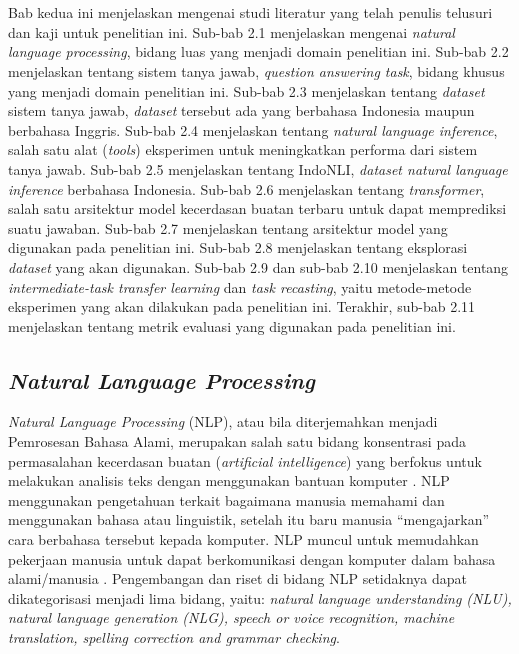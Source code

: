 \chapter{\babDua}
\label{bab:2}
Bab kedua ini menjelaskan mengenai studi literatur yang telah penulis telusuri dan kaji untuk penelitian ini. Sub-bab 2.1 menjelaskan mengenai \emph{natural language processing}, bidang luas yang menjadi domain penelitian ini. Sub-bab 2.2 menjelaskan tentang sistem tanya jawab, \emph{question answering task}, bidang khusus yang menjadi domain penelitian ini. Sub-bab 2.3 menjelaskan tentang \emph{dataset} sistem tanya jawab, \emph{dataset} tersebut ada yang berbahasa Indonesia maupun berbahasa Inggris. Sub-bab 2.4 menjelaskan tentang \emph{natural language inference}, salah satu alat (\emph{tools}) eksperimen untuk meningkatkan performa dari sistem tanya jawab. Sub-bab 2.5 menjelaskan tentang IndoNLI, \emph{dataset natural language inference} berbahasa Indonesia. Sub-bab 2.6 menjelaskan tentang \emph{transformer}, salah satu arsitektur model kecerdasan buatan terbaru untuk dapat memprediksi suatu jawaban. Sub-bab 2.7 menjelaskan tentang arsitektur model yang digunakan pada penelitian ini. Sub-bab 2.8 menjelaskan tentang eksplorasi \emph{dataset} yang akan digunakan. Sub-bab 2.9 dan sub-bab 2.10 menjelaskan tentang \emph{intermediate-task transfer learning} dan \emph{task recasting}, yaitu metode-metode eksperimen yang akan dilakukan pada penelitian ini. Terakhir, sub-bab 2.11 menjelaskan tentang metrik evaluasi yang digunakan pada penelitian ini.

\section{\emph{Natural Language Processing}}
\emph{Natural Language Processing} (NLP), atau bila diterjemahkan menjadi Pemrosesan Bahasa Alami, merupakan salah satu bidang konsentrasi pada permasalahan kecerdasan buatan (\emph{artificial intelligence}) yang berfokus untuk melakukan analisis teks dengan menggunakan bantuan komputer \citep{article-nlp}. NLP menggunakan pengetahuan terkait bagaimana manusia memahami dan menggunakan bahasa atau linguistik, setelah itu baru manusia “mengajarkan” cara berbahasa tersebut kepada komputer. NLP muncul untuk memudahkan pekerjaan manusia untuk dapat berkomunikasi dengan komputer dalam bahasa alami/manusia \citep{nlp-state-of-the-art}. Pengembangan dan riset di bidang NLP setidaknya dapat dikategorisasi menjadi lima bidang, yaitu: \emph{natural language understanding (NLU), natural language generation (NLG), speech or voice recognition, machine translation, spelling correction and grammar checking}. 

